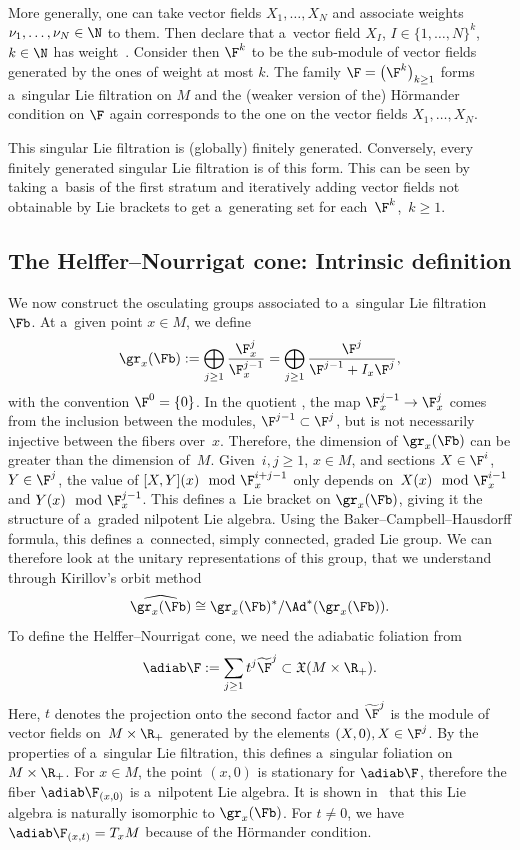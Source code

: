 \begin{ex}\label{Example : Finitely generated}
 More generally, one can take vector fields $X_1, \dots, X_N$ and associate weights $\nu_1,\dots,\nu_N \in \N$ to them. Then declare that a~vector field $X_I$, $I\in \{1,\dots,N\}^k$, $k\in \N$ has weight~. Consider then $\F^k$ to be the sub-module of vector fields generated by the ones of weight at most $k$. The family $\F = \bigl(\F^k\bigr)_{k\geq 1}$ forms a~singular Lie filtration on $M$ and the (weaker version of the) H\"ormander condition on $\F$ again corresponds to the one on the vector fields $X_1, \dots, X_N$.

 This singular Lie filtration is (globally) finitely generated. Conversely, every finitely generated singular Lie filtration is of this form. This can be seen by taking a~basis of the first stratum and iteratively adding vector fields not obtainable by Lie brackets to get a~generating set for each~$\F^k$,~$k\geq 1$.
\end{ex}


\subsection{The Helffer--Nourrigat cone: Intrinsic definition}

We now construct the osculating groups associated to a~singular Lie filtration $\Fb$. At a~given point $x\in M$, we define
\[\gr_x(\Fb):= \bigoplus_{j\geq 1} \frac{\F^j_x}{\F^{j-1}_x} = \bigoplus_{j\geq 1} \frac{\F^j}{\F^{j-1} + I_x\F^j},\]
with the convention $\F^0 = \{0\}$.
In the quotient , the map $\F^{j-1}_x \to \F^j_x$ comes from the inclusion between the modules, $\F^{j-1}\subset \F^j$, but is not necessarily injective between the fibers over~$x$. Therefore, the dimension of $\gr_x(\Fb)$ can be greater than the dimension of~$M$.
Given~${i,j\geq 1}$, $x\in M$, and sections $X\in \F^i$, $Y\in \F^j$, the value of $[X,Y](x) \mod \F_x^{i+j-1}$ only depends on~${X(x) \mod \F_x^{i-1}}$ and $Y(x) \mod \F_x^{j-1}$. This defines a~Lie bracket on $\gr_x(\Fb)$, giving it the structure of a~graded nilpotent Lie algebra. Using the Baker--Campbell--Hausdorff formula, this defines a~connected, simply connected, graded Lie group. We can therefore look at the unitary representations of this group, that we understand through Kirillov's orbit method~\cite{Kirillov}
\[\widehat{\gr_x(\Fb)} \cong {\gr_x(\Fb)^*}/{\Ad^*(\gr_x(\Fb))}.\]
To define the Helffer--Nourrigat cone, we need the adiabatic foliation from~\cite{AMYMaximalHypoellipticity}
\[\adiab\F := \sum_{j\geq 1} t^j\widetilde{\F}^j \subset \mathfrak{X}(M\times \R_+).\]
Here, $t$ denotes the projection onto the second factor and $\widetilde{\F}^j$ is the module of vector fields on~${M\times \R_+}$ generated by the elements $(X,0), X \in \F^j$. By the properties of a~singular Lie filtration, this defines a~singular foliation on $M \times \R_+$. For $x\in M$, the point $(x,0)$ is stationary for $\adiab\F$, therefore the fiber $\adiab\F_{(x,0)}$ is a~nilpotent Lie algebra. It is shown in~\cite[Proposition 1.6]{AMYMaximalHypoellipticity} that this Lie algebra is naturally isomorphic to $\gr_x(\Fb)$. For $t \neq 0$, we have $\adiab\F_{(x,t)} = T_xM$ because of the H\"ormander condition.

